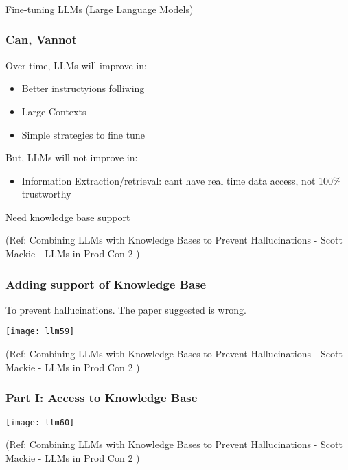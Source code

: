 \begin{frame}[fragile]\frametitle{}
\begin{center}
{\Large Fine-tuning LLMs (Large Language Models)}
\end{center}
\end{frame}

\begin{frame}[fragile]\frametitle{Can, Vannot}

Over time, LLMs will improve in:
\begin{itemize}
\item Better instructyions folliwing
\item Large Contexts
\item Simple strategies to fine tune
\end{itemize}	

But, LLMs will not improve in:
\begin{itemize}
\item Information Extraction/retrieval: cant have real time data access, not 100\% trustworthy
\end{itemize}

Need knowledge base support

{\tiny (Ref: Combining LLMs with Knowledge Bases to Prevent Hallucinations - Scott Mackie - LLMs in Prod Con 2 )}

\end{frame}

\begin{frame}[fragile]\frametitle{Adding support of Knowledge Base}

To prevent hallucinations. The paper suggested is wrong.


\begin{center}
\texttt{[image: llm59]}
\end{center}		


{\tiny (Ref: Combining LLMs with Knowledge Bases to Prevent Hallucinations - Scott Mackie - LLMs in Prod Con 2 )}

\end{frame}

\begin{frame}[fragile]\frametitle{Part I: Access to Knowledge Base}

\begin{center}
\texttt{[image: llm60]}
\end{center}		


{\tiny (Ref: Combining LLMs with Knowledge Bases to Prevent Hallucinations - Scott Mackie - LLMs in Prod Con 2 )}

\end{frame}


